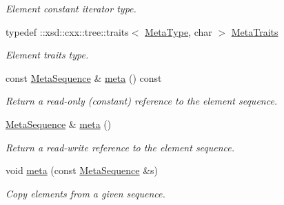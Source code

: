\begin{DoxyCompactItemize}
\begin{DoxyCompactList}\small\item\em Element constant iterator type. \item\end{DoxyCompactList}\item 
\hypertarget{classopenstack_1_1xml_1_1Metadata_a65237ad1c97500856654ae5cba325bb6}{
typedef ::xsd::cxx::tree::traits$<$ \hyperlink{classopenstack_1_1xml_1_1MetadataItem}{MetaType}, char $>$ \hyperlink{classopenstack_1_1xml_1_1Metadata_a65237ad1c97500856654ae5cba325bb6}{MetaTraits}}
\label{classopenstack_1_1xml_1_1Metadata_a65237ad1c97500856654ae5cba325bb6}

\begin{DoxyCompactList}\small\item\em Element traits type. \item\end{DoxyCompactList}\item 
const \hyperlink{classopenstack_1_1xml_1_1Metadata_a625af6c431b37f4669b9526fea99ecfd}{MetaSequence} \& \hyperlink{classopenstack_1_1xml_1_1Metadata_a06903ff7eb28f64eb92d58728dfc4137}{meta} () const 
\begin{DoxyCompactList}\small\item\em Return a read-\/only (constant) reference to the element sequence. \item\end{DoxyCompactList}\item 
\hyperlink{classopenstack_1_1xml_1_1Metadata_a625af6c431b37f4669b9526fea99ecfd}{MetaSequence} \& \hyperlink{classopenstack_1_1xml_1_1Metadata_af02910b7e20e1c09ff86138d5334529f}{meta} ()
\begin{DoxyCompactList}\small\item\em Return a read-\/write reference to the element sequence. \item\end{DoxyCompactList}\item 
void \hyperlink{classopenstack_1_1xml_1_1Metadata_a971af5da73538466be80fce27ae4901f}{meta} (const \hyperlink{classopenstack_1_1xml_1_1Metadata_a625af6c431b37f4669b9526fea99ecfd}{MetaSequence} \&s)
\begin{DoxyCompactList}\small\item\em Copy elements from a given sequence. \item\end{DoxyCompactList}\end{DoxyCompactItemize}
